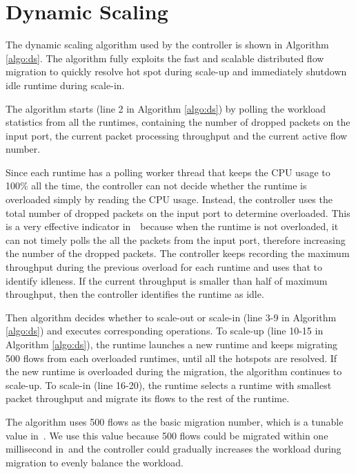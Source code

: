 \section{Dynamic Scaling}
\label{sec:ds}

The dynamic scaling algorithm used by the controller is shown in Algorithm \ref{algo:ds}. The algorithm fully exploits the fast and scalable distributed flow migration to quickly resolve hot spot during scale-up and immediately shutdown idle runtime during scale-in.

The algorithm starts (line 2 in Algorithm \ref{algo:ds}) by polling the workload statistics from all the runtimes, containing the number of dropped packets on the input port, the current packet processing throughput and the current active flow number.

Since each runtime has a polling worker thread that keeps the CPU usage to 100\% all the time, the controller can not decide whether the runtime is overloaded simply by reading the CPU usage. Instead, the controller uses the total number of dropped packets on the input port to determine overloaded. This is a very effective indicator in~\nfactor~because when the runtime is not overloaded, it can not timely polls the all the packets from the input port, therefore increasing the number of the dropped packets. The controller keeps recording the maximum throughput during the previous overload for each runtime and uses that to identify idleness. If the current throughput is smaller than half of maximum throughput, then the controller identifies the runtime as idle.

Then algorithm decides whether to scale-out or scale-in (line 3-9 in Algorithm \ref{algo:ds}) and executes corresponding operations. To scale-up (line 10-15 in Algorithm \ref{algo:ds}), the runtime launches a new runtime and keeps migrating 500 flows from each overloaded runtimes, until all the hotspots are resolved. If the new runtime is overloaded during the migration, the algorithm continues to scale-up. To scale-in (line 16-20), the runtime selects a runtime with smallest packet throughput and migrate its flows to the rest of the runtime.

The algorithm uses 500 flows as the basic migration number, which is a tunable value in~\nfactor. We use this value because 500 flows could be migrated within one millisecond in~\nfactor and the controller could gradually increases the workload during migration to evenly balance the workload.



